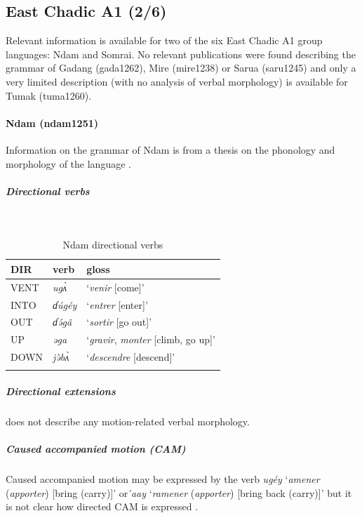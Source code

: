 \subsection{East Chadic A1 (2/6)}

Relevant information is available for two of the six East Chadic A1 group languages: Ndam and Somrai. No relevant publications were found describing the grammar of Gadang (gada1262), Mire (mire1238) or Sarua (saru1245) and only a very limited description (with no analysis of verbal morphology) is available for Tumak (tuma1260).

\paragraph*{Ndam (ndam1251)} \label{ndam}

Information on the grammar of Ndam is from a thesis on the phonology and morphology of the language \citep{brossMaterialenZurSprache1988}.

\subparagraph{Directional verbs}~

\begin{table}[H]
	\caption{Ndam directional verbs}
	\label{tab:ndamV}
	\begin{tabular}{lll} %
		\lsptoprule
		DIR & verb & gloss   \\ %
		\midrule
		VENT &\textit{ugʌ̀} & `\textit{venir} [come]' \\
		INTO& \textit{ɗúgéy} & `\textit{entrer} [enter]' \\
		OUT & \textit{ɗə́gâ} & `\textit{sortir} [go out]' \\
		UP & \textit{əga} & `\textit{gravir}, \textit{monter} [climb, go up]' \\
		DOWN & \textit{jə̀bʌ̀} & `\textit{descendre} [descend]' \\
		\lspbottomrule
	\end{tabular}
\end{table}

\subparagraph{Directional extensions}

\citet{brossMaterialenZurSprache1988} does not describe any motion-related verbal morphology.

\subparagraph{Caused accompanied motion (CAM)}

Caused accompanied motion may be expressed by the verb \textit{ugéy} `\textit{amener} (\textit{apporter}) [bring (carry)]' or \textit{́aay} `\textit{ramener} (\textit{apporter}) [bring back (carry)]' but it is not clear how directed CAM is expressed \citep[66, 90]{brossMaterialenZurSprache1988}. 

